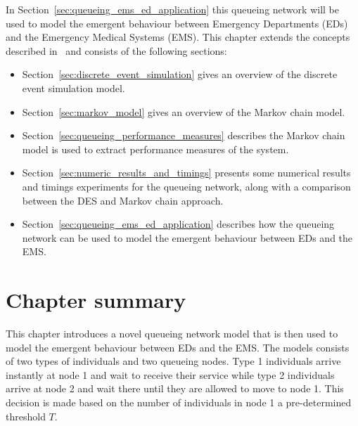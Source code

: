 In Section~\ref{sec:queueing_ems_ed_application} this queueing network will be
used to model the emergent behaviour between
Emergency Departments (EDs) and the Emergency Medical Systems (EMS).
This chapter extends the concepts described in~\cite{panayides2023game} and
consists of the following sections:

\begin{itemize}
    \item Section~\ref{sec:discrete_event_simulation} gives an overview of
    the discrete event simulation model.
    \item Section~\ref{sec:markov_model} gives an overview of the Markov
    chain model.
    \item Section~\ref{sec:queueing_performance_measures} describes the Markov
    chain model is used to extract performance measures of the system.
    \item Section~\ref{sec:numeric_results_and_timings} presents some numerical
    results and timings experiments for the queueing network, along with
    a comparison between the DES and Markov chain approach.
    \item Section~\ref{sec:queueing_ems_ed_application} describes how the
    queueing network can be used to model the emergent behaviour between
    EDs and the EMS.
\end{itemize}















\section{Chapter summary}

This chapter introduces a novel queueing network model that is then used to
model the emergent behaviour between EDs and the EMS.
The models consists of two types of individuals and two queueing nodes.
Type 1 individuals arrive instantly at node 1 and wait to receive their
service while type 2 individuals arrive at node 2 and wait there until they
are allowed to move to node 1.
This decision is made based on the number of individuals in node 1 a
pre-determined threshold \(T\).

